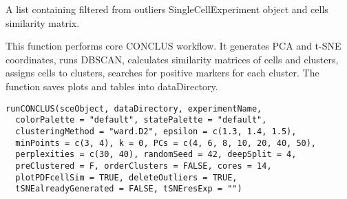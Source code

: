 \documentclass[a4paper]{book}
\begin{document}
%
\begin{Value}
A list containing filtered from outliers SingleCellExperiment object and cells similarity matrix.
\end{Value}
%
\begin{Description}\relax
This function performs core CONCLUS workflow. It generates PCA and t-SNE coordinates, 
runs DBSCAN, calculates similarity matrices of cells and clusters, assigns cells to clusters,
searches for positive markers for each cluster. The function saves plots and tables into dataDirectory.
\end{Description}
%
\begin{Usage}
\begin{verbatim}
runCONCLUS(sceObject, dataDirectory, experimentName,
  colorPalette = "default", statePalette = "default",
  clusteringMethod = "ward.D2", epsilon = c(1.3, 1.4, 1.5),
  minPoints = c(3, 4), k = 0, PCs = c(4, 6, 8, 10, 20, 40, 50),
  perplexities = c(30, 40), randomSeed = 42, deepSplit = 4,
  preClustered = F, orderClusters = FALSE, cores = 14,
  plotPDFcellSim = TRUE, deleteOutliers = TRUE,
  tSNEalreadyGenerated = FALSE, tSNEresExp = "")
\end{verbatim}
\end{Usage}
%
\end{document}
